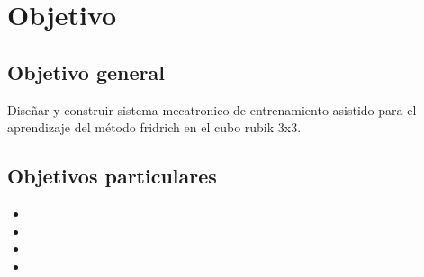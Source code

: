 \section{Objetivo}


\subsection{Objetivo general}
\label{Objetivo general}

Diseñar y construir sistema mecatronico de entrenamiento asistido para el aprendizaje del método fridrich en el cubo rubik 3x3.

\subsection{Objetivos particulares}
\begin{itemize}
    \item 
    \item 
    \item 
    \item 
\end{itemize}
    